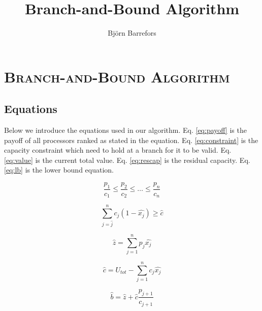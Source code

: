 \documentclass{article}
\title{\textbf{\fontfamily{\sfdefault}\selectfont Branch-and-Bound Algorithm}}
\author{Bj\"{o}rn Barrefors}
\begin{document}
  \maketitle
  \section{\textsc{Branch-and-Bound Algorithm}}

  \subsection{Equations}
    Below we introduce the equations used in our algorithm. \newline
    Eq. \ref{eq:payoff} is the payoff of all processors ranked as stated in the equation. \newline
    Eq. \ref{eq:constraint} is the capacity constraint which need to hold at a branch for it to be valid. \newline
    Eq. \ref{eq:value} is the current total value. \newline
    Eq. \ref{eq:rescap} is the residual capacity. \newline
    Eq. \ref{eq:lb} is the lower bound equation.

    \begin{equation}\label{eq:payoff}
      \frac{p_{1}}{c_{1}} \leq \frac{p_{2}}{c_{2}} \leq \ldots \leq \frac{p_{n}}{c_{n}}
    \end{equation}

    \begin{equation}\label{eq:constraint}
      \sum_{j=\hat{j}}^{n}c_{j}(1-\hat{x_{j}}) \geq \hat{c}
    \end{equation}

    \begin{equation}\label{eq:value}
      \hat{z} = \sum_{j=1}^{n} p_{j}\hat{x_{j}}
    \end{equation}

    \begin{equation}\label{eq:rescap}
      \hat{c} = U_{tot} - \sum_{j=1}^{n} c_{j}\hat{x_{j}}
    \end{equation}

    \begin{equation}\label{eq:lb}
      \hat{b} = \hat{z} + \hat{c}\frac{p_{j+1}}{c_{j+1}}
    \end{equation}
\end{document}
